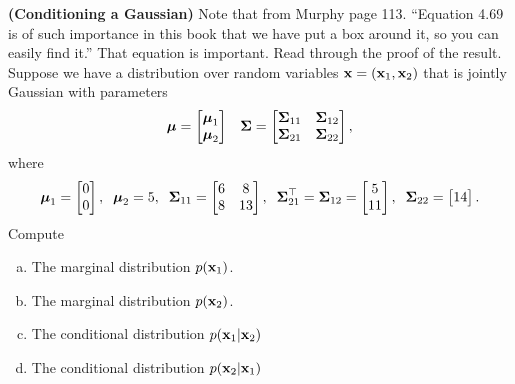 \documentclass[12pt,letterpaper,fleqn]{hmcpset}
\begin{document}
\begin{problem}[1]
\textbf{(Conditioning a Gaussian)} Note that from Murphy page 113. ``Equation 4.69
is of such importance in this book that we have put a box around it, so you can easily
find it.'' That equation is important. Read through the proof of the result.
Suppose we have a distribution over random variables ${\bf x} = ({\bf x}_1, {\bf x}_2)$ that is
jointly Gaussian with parameters
\[
    \hbox{\boldmath$\mu$} = \begin{bmatrix} \hbox{\boldmath$\mu$}_1\\\hbox{\boldmath$\mu$}_2 \end{bmatrix}\;\;\; \hbox{\boldmath$\Sigma$} = \begin{bmatrix} \hbox{\boldmath$\Sigma$}_{11}&\hbox{\boldmath$\Sigma$}_{12}\\\hbox{\boldmath$\Sigma$}_{21}&\hbox{\boldmath$\Sigma$}_{22} \end{bmatrix},
\]
where
\[
    \hbox{\boldmath$\mu$}_1 = \begin{bmatrix} 0\\0 \end{bmatrix}, \;\; \hbox{\boldmath$\mu$}_2 = 5, \;\; \hbox{\boldmath$\Sigma$}_{11} = \begin{bmatrix} 6 & 8\\ 8 & 13 \end{bmatrix}, \;\; \hbox{\boldmath$\Sigma$}_{21}^\top = \hbox{\boldmath$\Sigma$}_{12} = \begin{bmatrix} 5\\11 \end{bmatrix}, \;\; \hbox{\boldmath$\Sigma$}_{22} = \begin{bmatrix} 14 \end{bmatrix}.
\]
Compute
\begin{enumerate}[(a)]
    \item The marginal distribution $p({\bf x}_1)$.
    \item The marginal distribution $p({\bf x}_2)$.
    \item The conditional distribution $p({\bf x}_1 | {\bf x}_2)$
    \item The conditional distribution $p({\bf x}_2 | {\bf x}_1)$
\end{enumerate}

\end{problem}
\end{document}
